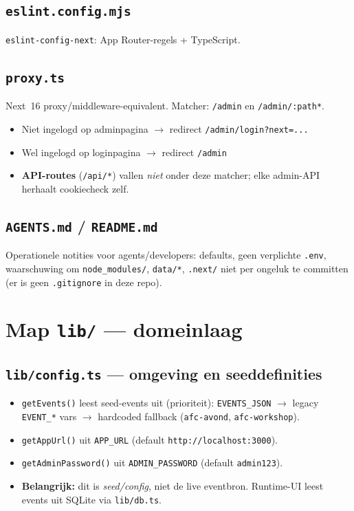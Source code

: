 \documentclass[11pt,a4paper]{report}
\begin{document}
\subsection{\texttt{eslint.config.mjs}}
\texttt{eslint-config-next}: App Router-regels + TypeScript.

\subsection{\texttt{proxy.ts}}
Next~16 proxy/middleware-equivalent. Matcher: \texttt{/admin} en \texttt{/admin/:path*}.
\begin{itemize}[leftmargin=*]
  \item Niet ingelogd op adminpagina $\to$ redirect \texttt{/admin/login?next=...}
  \item Wel ingelogd op loginpagina $\to$ redirect \texttt{/admin}
  \item \textbf{API-routes} (\texttt{/api/*}) vallen \emph{niet} onder deze matcher;
        elke admin-API herhaalt cookiecheck zelf.
\end{itemize}

\subsection{\texttt{AGENTS.md} / \texttt{README.md}}
Operationele notities voor agents/developers: defaults, geen verplichte \texttt{.env},
waarschuwing om \texttt{node\_modules/}, \texttt{data/*}, \texttt{.next/} niet per ongeluk te committen
(er is geen \texttt{.gitignore} in deze repo).

\section{Map \texttt{lib/} --- domeinlaag}

\subsection{\texttt{lib/config.ts} --- omgeving en seeddefinities}
\begin{itemize}[leftmargin=*]
  \item \texttt{getEvents()} leest seed-events uit (prioriteit):
    \texttt{EVENTS\_JSON} $\to$ legacy \texttt{EVENT\_*} vars $\to$ hardcoded fallback
    (\texttt{afc-avond}, \texttt{afc-workshop}).
  \item \texttt{getAppUrl()} uit \texttt{APP\_URL} (default \texttt{http://localhost:3000}).
  \item \texttt{getAdminPassword()} uit \texttt{ADMIN\_PASSWORD} (default \texttt{admin123}).
  \item \textbf{Belangrijk:} dit is \emph{seed/config}, niet de live eventbron.
        Runtime-UI leest events uit SQLite via \texttt{lib/db.ts}.
\end{itemize}
\end{document}
